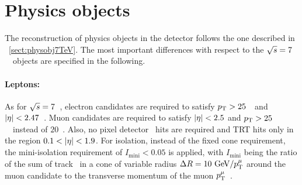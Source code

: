 \section{Physics objects}
\label{sect:physobj8TeV}
%
The reconstruction of physics objects in the detector follows the one described in \sect~\ref{sect:physobj7TeV}. 
%
The most important differences with respect to the ${\sqrt{s}}=7$~\TeV\ objects are specified in the following. 
%
%
\paragraph{Leptons:}\mbox{}
%
As for ${\sqrt{s}}=7$~\TeV, electron candidates are required to satisfy $p_\mathrm{T}>25$~\GeV\ and $|\eta|<2.47$~\cite{ATLASCollaboration2014b}.
%
Muon candidates are required to satisfy $|\eta|<2.5$ and $p_\mathrm{T} > 25$~\GeV\ instead of $20$~\GeV. Also, no pixel detector \blayer\ hits are required and \gls{TRT} hits only in the region $0.1<\abseta<1.9$. 
%
For isolation, instead of the fixed cone requirement, the mini-isolation requirement of $I_\mathrm{mini}<0.05$ is applied, with $I_\mathrm{mini}$ being the ratio of the sum of track \pt\ in a cone of variable radius $\Delta R = 10~\mathrm{GeV}/p_\mathrm{T}^\mu$ around the muon candidate to the transverse momentum of the muon $p_\mathrm{T}^\mu$~\cite{Rehermann2011}.
%
%
